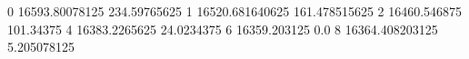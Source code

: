 0 16593.80078125 234.59765625
1 16520.681640625 161.478515625
2 16460.546875 101.34375
4 16383.2265625 24.0234375
6 16359.203125 0.0
8 16364.408203125 5.205078125

